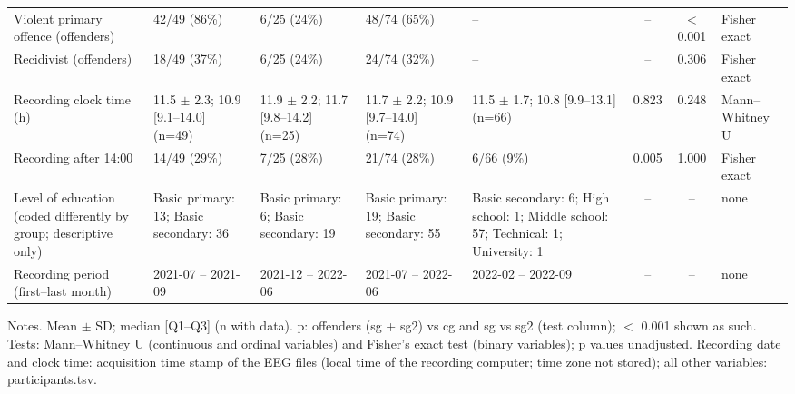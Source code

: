 \begin{table}[htbp]
{\begin{tabular}{p{3.2cm}p{2.6cm}p{2.6cm}p{2.6cm}p{2.6cm}ccl}
Violent primary offence (offenders) & 42/49 (86\%) & 6/25 (24\%) & 48/74 (65\%) & -- & -- & $<$ 0.001 & Fisher exact \\
Recidivist (offenders) & 18/49 (37\%) & 6/25 (24\%) & 24/74 (32\%) & -- & -- & 0.306 & Fisher exact \\
Recording clock time (h) & 11.5 $\pm$ 2.3; 10.9 [9.1--14.0] (n=49) & 11.9 $\pm$ 2.2; 11.7 [9.8--14.2] (n=25) & 11.7 $\pm$ 2.2; 10.9 [9.7--14.0] (n=74) & 11.5 $\pm$ 1.7; 10.8 [9.9--13.1] (n=66) & 0.823 & 0.248 & Mann--Whitney U \\
Recording after 14:00 & 14/49 (29\%) & 7/25 (28\%) & 21/74 (28\%) & 6/66 (9\%) & 0.005 & 1.000 & Fisher exact \\
Level of education (coded differently by group; descriptive only) & Basic primary: 13; Basic secondary: 36 & Basic primary: 6; Basic secondary: 19 & Basic primary: 19; Basic secondary: 55 & Basic secondary: 6; High school: 1; Middle school: 57; Technical: 1; University: 1 & -- & -- & none \\
Recording period (first--last month) & 2021-07 -- 2021-09 & 2021-12 -- 2022-06 & 2021-07 -- 2022-06 & 2022-02 -- 2022-09 & -- & -- & none \\
\bottomrule
\end{tabular}
}
\par\smallskip
\begin{minipage}{\textwidth}\raggedright\scriptsize
Notes. Mean $\pm$ SD; median [Q1--Q3] (n with data). p: offenders (sg + sg2) vs cg and sg vs sg2 (test column); $<$ 0.001 shown as such. Tests: Mann--Whitney U (continuous and ordinal variables) and Fisher's exact test (binary variables); p values unadjusted. Recording date and clock time: acquisition time stamp of the EEG files (local time of the recording computer; time zone not stored); all other variables: participants.tsv.
\end{minipage}
\end{table}

